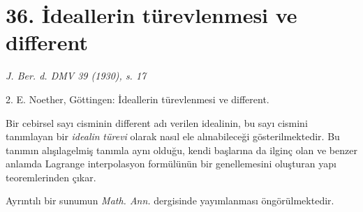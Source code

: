 \documentclass[11pt]{article}
\begin{document}
\section*{36. İdeallerin türevlenmesi ve different}

\begin{center}
\emph{J. Ber. d. DMV 39 (1930), s. 17}
\end{center}

2. E. Noether, Göttingen: İdeallerin türevlenmesi ve different.

Bir cebirsel sayı cisminin different adı verilen idealinin, bu sayı cismini tanımlayan bir \emph{idealin} \emph{türevi} olarak nasıl ele alınabileceği gösterilmektedir. Bu tanımın alışılagelmiş tanımla aynı olduğu, kendi başlarına da ilginç olan ve benzer anlamda Lagrange interpolasyon formülünün bir genellemesini oluşturan yapı teoremlerinden çıkar.

Ayrıntılı bir sunumun \emph{Math. Ann.} dergisinde yayımlanması öngörülmektedir.
\end{document}
